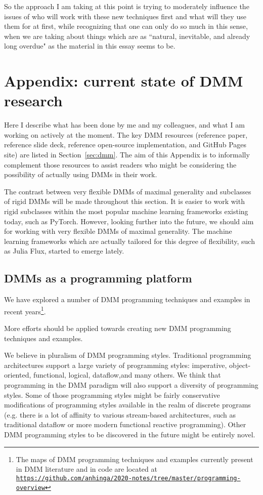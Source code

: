 \documentclass{article}
\begin{document}
So the approach I am taking at this point is trying to moderately influence the issues of
who will work with these new techniques first and what will they use them for at first, while recognizing that
one can only do so much in this sense, when we are taking about things which are as
``natural, inevitable, and already long overdue" as the material in this essay seems to be.



\appendix

\section{Appendix: current state of DMM research}

Here I describe what has been done by me and my colleagues, and what I am working on actively at the moment.  The key DMM resources (reference paper, reference slide
deck, reference open-source implementation, and GitHub Pages site) are listed in Section~\ref{sec:dmm}. The aim of this Appendix
is to informally complement those resources to assist readers who might be considering the possibility of actually
using DMMs in their work.

The contrast between very flexible DMMs of maximal generality and subclasses of rigid DMMs will be made throughout this section. It is easier to work with rigid subclasses within the most popular machine learning frameworks existing today, such as PyTorch. However, looking further into the future, we should aim for working with very flexible DMMs of maximal generality.
The machine learning frameworks which are actually tailored for this degree of flexibility, such as Julia Flux, started to emerge lately.

\subsection{DMMs as a programming platform}

We have explored a number of DMM programming techniques and examples in recent years\footnote{The maps of
DMM programming techniques and examples currently present in DMM literature and in code are located at
\href{https://github.com/anhinga/2020-notes/tree/master/programming-overview}{\tt https://github.com/anhinga/2020-notes/tree/master/programming-overview}}.

More efforts should be applied towards creating new DMM programming techniques and examples.

We believe in pluralism of DMM programming styles. 
Traditional programming architectures support a large variety of programming styles: imperative, object-oriented, functional, logical, dataflow,and many others. We think that programming in the DMM paradigm will also support a diversity of programming styles. Some of those programming styles might be fairly conservative modifications of programming styles available in the realm of discrete programs (e.g. there is a lot of affinity to various stream-based architectures, such
as traditional dataflow or more modern functional reactive programming).
Other DMM programming styles to be discovered in the future might be entirely novel. 
\end{document}
